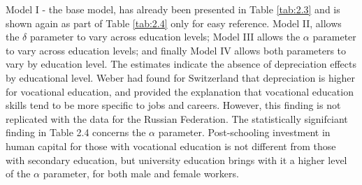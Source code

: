 \documentclass[12pt,a4paper]{article}
\numberwithin{equation}{section}
\begin{document}
\vspace{3pt}

Model I - the base model, has already been presented in Table \ref{tab:2.3} and is shown again as part of Table \ref{tab:2.4} only for easy reference. Model II, allows the $\delta$ parameter to vary across education levels; Model III allows the $\alpha$ parameter to vary across education levels; and finally Model IV allows both parameters to vary by education level. The estimates indicate the absence of depreciation effects by educational level. Weber had found for Switzerland  that depreciation is higher for vocational education, and provided the explanation that vocational education skills tend to be more specific to jobs and careers. However, this finding is not replicated with the data for the Russian Federation. The statistically signifciant finding in Table 2.4 concerns the $\alpha$ parameter. Post-schooling investment in human capital for those with vocational education is not different from those with secondary education, but university education brings with it a higher level of the $\alpha$ parameter, for both male and female workers. 
\end{document}
